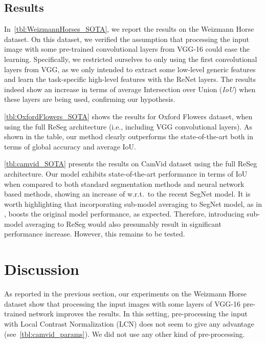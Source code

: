 \documentclass[times,art10,twocolumn,latex8]{article}
\begin{document}
\subsection{Results}

In~\autoref{tbl:WeizmannHorses_SOTA}, we report the results on the Weizmann
Horse dataset. On this dataset, we verified the assumption that processing
the input image with some pre-trained convolutional layers from VGG-16 could
ease the learning. Specifically, we restricted ourselves to only using the
first  convolutional layers from VGG, as we only intended to extract some
low-level generic features and learn the task-specific high-level features with
the ReNet layers. The results indeed show an increase in terms of average Intersection
over Union (\emph{IoU}) when these layers are being used, confirming our
hypothesis.

\autoref{tbl:OxfordFlowers_SOTA} shows the results for Oxford Flowers
dataset, when using the full ReSeg architecture (i.e., including VGG convolutional layers).
As shown in the table, our method clearly outperforms the
state-of-the-art both in terms of global accuracy and average IoU.

\autoref{tbl:camvid_SOTA} presents the results on CamVid dataset using the full
ReSeg architecture. Our model exhibits state-of-the-art performance in terms of
IoU when compared to both standard segmentation methods and neural network
based methods, showing an increase of  w.r.t.\ to the recent SegNet
model. It is worth highlighting that incorporating sub-model averaging to
SegNet model, as in \cite{Kendall2015bayesiansegnet}, boosts the original model
performance, as expected. Therefore, introducing sub-model averaging to ReSeg
would also presumably result in significant performance increase.  However,
this remains to be tested.







\section{Discussion}

As reported in the previous section, our experiments on the Weizmann Horse
dataset show that processing the input images with some layers of VGG-16
pre-trained network improves the results. In this setting, pre-processing the input
with Local Contrast Normalization (LCN) does not seem to give any advantage
(see~\autoref{tbl:camvid_params}). We did not use any other kind of
pre-processing.
\end{document}
